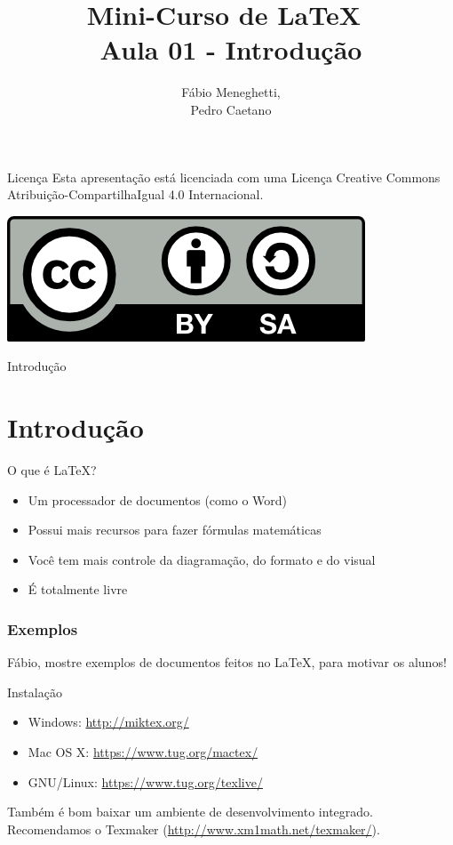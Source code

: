 \documentclass[12pt]{beamer}
\title{Mini-Curso de \LaTeX\ \\ Aula 01 - Introdução}
\author{Fábio Meneghetti,\\
Pedro Caetano}
\date{}
\begin{document}
\begin{frame}
  \titlepage
\end{frame}

\begin{frame}{Licença}
  Esta apresentação está licenciada com uma Licença Creative Commons Atribuição-CompartilhaIgual 4.0 Internacional.
  \begin{center}
    \includegraphics[scale=0.3]{../license.png}
  \end{center}
\end{frame}

\begin{frame}{Introdução}
  \section{Introdução}
  \begin{large}O que é \LaTeX?\end{large}

  \begin{itemize}
    \item Um processador de documentos (como o Word)
    \item Possui mais recursos para fazer fórmulas matemáticas
    \item Você tem mais controle da diagramação, do formato e do visual
    \item É totalmente livre
  \end{itemize}

\end{frame}

\begin{frame}
  \frametitle{Exemplos}
  Fábio, mostre exemplos de documentos feitos no \LaTeX, para motivar os alunos!
\end{frame}

\begin{frame}{Instalação}
  \begin{itemize}
    \item Windows: \url{http://miktex.org/}
    \item Mac OS X: \url{https://www.tug.org/mactex/}
    \item GNU/Linux: \url{https://www.tug.org/texlive/}
  \end{itemize}
  Também é bom baixar um ambiente de desenvolvimento integrado. Recomendamos o Texmaker (\url{http://www.xm1math.net/texmaker/}).
\end{frame}
\end{document}
